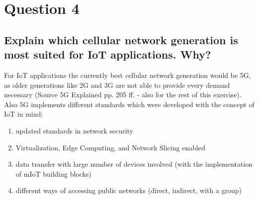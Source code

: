 \documentclass{report}
\begin{document}
	\section{Question 4}
	\startsection
		\renewcommand{\thesubsection}{\thesection.\Alph{subsection}}
		\subsection{Explain which cellular network generation is most suited for IoT applications. Why?}
		\startsubsection
			For IoT applications the currently best cellular network generation would be 5G, as older generations like 2G and 3G are not able to provide every demand necessary (Source 5G Explained pp. 205 ff. - also for the rest of this exercise). Also 5G implements different standards which were developed with the concept of IoT in mind:
			\begin{enumerate}[-]
				\item updated standards in network security
				\item Virtualization, Edge Computing, and Network Slicing enabled
				\item data transfer with large number of devices involved (with the implementation of mIoT building blocks)
				\item different ways of accessing public networks (direct, indirect, with a group)
			\end{enumerate}
		\closesection
	\closesection
\end{document}
